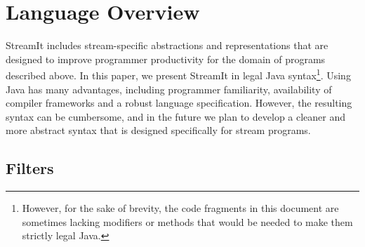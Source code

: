 
\section{Language Overview}
\label{sec:overview}

StreamIt includes stream-specific abstractions and representations
that are designed to improve programmer productivity for the domain of
programs described above.  In this paper, we present StreamIt in legal
Java syntax\footnote{However, for the sake of brevity, the code
fragments in this document are sometimes lacking modifiers or methods
that would be needed to make them strictly legal Java.}.  Using Java
has many advantages, including programmer familiarity, availability of
compiler frameworks and a robust language specification.  However, the
resulting syntax can be cumbersome, and in the future we plan to
develop a cleaner and more abstract syntax that is designed
specifically for stream programs.


\subsection{Filters}

